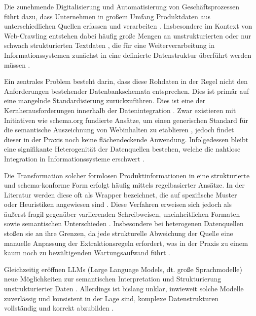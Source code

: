 Die zunehmende Digitalisierung und Automatisierung von Geschäftsprozessen führt dazu, dass Unternehmen in großem Umfang Produktdaten aus unterschiedlichen Quellen erfassen und 
verarbeiten \parencite[vgl.][S. 1165f.]{chen2012business}. 
Insbesondere im Kontext von Web-Crawling entstehen dabei häufig große Mengen an unstrukturierten oder nur schwach strukturierten Textdaten \parencite[vgl.][S. 2]{ferrara2014web},
 die für eine Weiterverarbeitung in 
Informationssystemen zunächst in eine definierte Datenstruktur überführt werden müssen \parencite[vgl.][S. 3]{doan2012principles}.

Ein zentrales Problem besteht darin, dass diese Rohdaten in der Regel nicht den Anforderungen bestehender Datenbankschemata entsprechen. Dies ist primär auf eine mangelnde 
Standardisierung zurückzuführen. Dies ist eine der Kernherausforderungen innerhalb der Datenintegration \parencite[vgl.][S. 1--15]{doan2012principles}. 
Zwar existieren mit Initiativen wie schema.org fundierte Ansätze, um einen generischen Standard für die semantische Auszeichnung von Webinhalten zu 
etablieren \parencite[vgl.][S. 44]{guha2016schema}, jedoch findet dieser in der Praxis noch keine flächendeckende Anwendung. Infolgedessen bleibt eine signifikante Heterogenität 
der Datenquellen bestehen, welche die nahtlose Integration in Informationssysteme erschwert \parencite[vgl.][S. 1]{meusel2015web}.

Die Transformation solcher formlosen Produktinformationen in eine strukturierte und schema-konforme Form erfolgt häufig mittels regelbasierter Ansätze. In der Literatur 
werden diese oft als Wrapper bezeichnet, die auf spezifische Muster oder Heuristiken angewiesen sind \parencite[vgl.][S. 9]{ferrara2014web}. Diese Verfahren erweisen sich 
jedoch als äußerst fragil gegenüber variierenden Schreibweisen, uneinheitlichen Formaten sowie semantischen Unterschieden \parencite[vgl.][S. 12]{ferrara2014web}. 
Insbesondere bei heterogenen Datenquellen stoßen sie an ihre Grenzen, da jede strukturelle Abweichung der Quelle eine manuelle Anpassung der Extraktionsregeln erfordert, 
was in der Praxis zu einem kaum noch zu bewältigenden Wartungsaufwand führt \parencite[vgl.][S. 14]{ferrara2014web}.

Gleichzeitig eröffnen LLMs (Large Language Models, dt. große Sprachmodelle) neue Möglichkeiten zur semantischen Interpretation und Strukturierung unstrukturierter Daten 
\parencite[vgl.][]{data_extraction_ai}. Allerdings ist bislang unklar, inwieweit solche Modelle zuverlässig und konsistent in der Lage sind, komplexe Datenstrukturen vollständig 
und korrekt abzubilden \parencite[vgl.][S. 1283]{data_extraction_ai}. 


